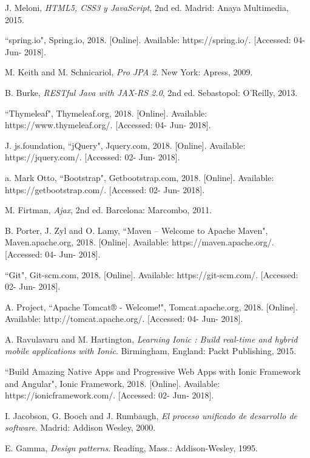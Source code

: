 \begin{thebibliography}{9}

\thispagestyle{numberingStyle}
\pagestyle{numberingStyle}


J. Meloni, \textit{HTML5, CSS3 y JavaScript}, 2nd ed. Madrid: Anaya Multimedia, 2015.

``spring.io", Spring.io, 2018. [Online]. Available: https://spring.io/. [Accessed: 04- Jun- 2018].

M. Keith and M. Schnicariol, \textit{Pro JPA 2}. New York: Apress, 2009.

B. Burke, \textit{RESTful Java with JAX-RS 2.0}, 2nd ed. Sebastopol: O'Reilly, 2013.

``Thymeleaf", Thymeleaf.org, 2018. [Online]. Available: https://www.thymeleaf.org/. [Accessed: 04- Jun- 2018].

J. js.foundation, ``jQuery", Jquery.com, 2018. [Online]. Available: https://jquery.com/. [Accessed: 02- Jun- 2018].

a. Mark Otto, ``Bootstrap", Getbootstrap.com, 2018. [Online]. Available: https://getbootstrap.com/. [Accessed: 02- Jun- 2018].


M. Firtman, \textit{Ajax}, 2nd ed. Barcelona: Marcombo, 2011.

B. Porter, J. Zyl and O. Lamy, ``Maven – Welcome to Apache Maven", Maven.apache.org, 2018. [Online]. Available: https://maven.apache.org/. [Accessed: 04- Jun- 2018].


``Git", Git-scm.com, 2018. [Online]. Available: https://git-scm.com/. [Accessed: 02- Jun- 2018].

A. Project, ``Apache Tomcat® - Welcome!", Tomcat.apache.org, 2018. [Online]. Available: http://tomcat.apache.org/. [Accessed: 04- Jun- 2018].

A. Ravulavaru and M. Hartington, \textit{Learning Ionic : Build real-time and hybrid mobile applications with Ionic}. Birmingham, England: Packt Publishing, 2015.

``Build Amazing Native Apps and Progressive Web Apps with Ionic Framework and Angular", Ionic Framework, 2018. [Online]. Available: https://ionicframework.com/. [Accessed: 02- Jun- 2018].

I. Jacobson, G. Booch and J. Rumbaugh, \textit{El proceso unificado de desarrollo de software}. Madrid: Addison Wesley, 2000.

E. Gamma, \textit{Design patterns}. Reading, Mass.: Addison-Wesley, 1995.



\end{thebibliography}

